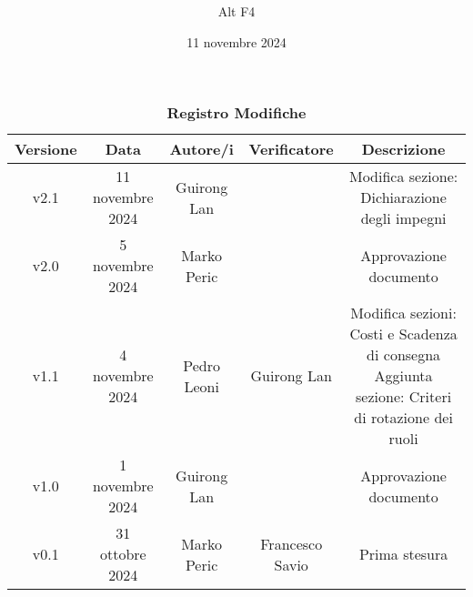 \documentclass[a4paper, 12pt]{article}
\title{\Huge \textbf{\titolo}}
\author{\Large{Alt} \raisebox{0.3ex}{\normalsize  +} \Large{F4}}
\date{11 novembre 2024}
\def\logo{../Immagini/logo.jpeg}
\def\ultima-versione{v2.1}
\begin{document}
\begin{titlepage}      
    \maketitle
    \thispagestyle{empty}  

\end{titlepage}

\thispagestyle{plain}
\begin{table}[H]
    \centering
    \caption*{\textbf{\Large Registro Modifiche}}
    {\renewcommand{\arraystretch}{2}
    \begin{tabularx}{\textwidth}{| c | c | C | C | C |}
        \hline
            \textbf{\normalsize Versione} & 
            \textbf{\normalsize Data} & 
            \textbf{\normalsize Autore/i} & 
            \textbf{\normalsize Verificatore} &
            \textbf{\normalsize Descrizione} \\ 
        \hline \hline
        \ultima-versione & 
        11 novembre 2024& 
        Guirong Lan &
        & 
        Modifica sezione: Dichiarazione degli impegni\\
        \hline
        v2.0 & 
        5 novembre 2024& 
        Marko Peric &
        & 
        Approvazione documento \\
        \hline
        v1.1 &
        4 novembre 2024 &
        Pedro Leoni &
        Guirong Lan&
        Modifica sezioni: Costi e Scadenza di consegna
        Aggiunta sezione: Criteri di rotazione dei ruoli \\
        \hline
        v1.0 & 
        1 novembre 2024& 
        Guirong Lan &
        & 
        Approvazione documento \\
        \hline 
        v0.1 &
        31 ottobre 2024 & 
        Marko Peric &
        Francesco Savio &
        Prima stesura \\
        \hline
    \end{tabularx}}
\end{table}
\restoregeometry
\end{document}
